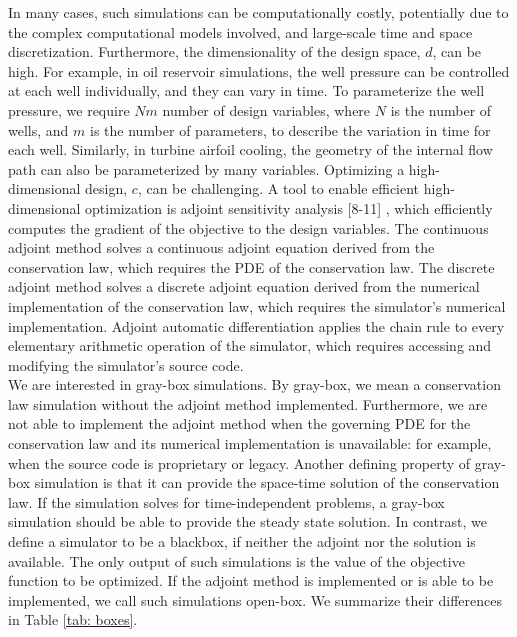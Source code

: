 \documentclass[a4paper,onecolumn]{article}
\theoremstyle{remark}
\begin{document}
\indent 
In many cases, such simulations can be computationally costly, potentially 
due to the complex computational models involved, and
large-scale time and space discretization. Furthermore, 
the dimensionality of the design space, $d$, can be high. 
For example, in oil reservoir simulations, the well pressure can be controlled at each well
individually, and they can vary in time.
To parameterize the well pressure, we require $Nm$ number of design variables, where $N$ is the number of wells,
and $m$ is the number of parameters, to describe the variation in time for each well.
Similarly, in turbine airfoil cooling,
the geometry of the internal flow path can also be parameterized by many variables.
Optimizing a high-dimensional design, $c$,
can be challenging.
A tool to enable efficient high-dimensional optimization is adjoint sensitivity analysis
[8-11]
, which efficiently computes the gradient of the objective to the design variables. 
The continuous adjoint method solves 
a continuous adjoint equation derived from the conservation law, which 
requires the PDE of the conservation law.
The discrete adjoint method solves a discrete adjoint equation derived 
from the numerical implementation of the conservation law,
which requires the simulator's numerical implementation.
Adjoint automatic differentiation applies the chain rule to every elementary arithmetic operation of the simulator,
which requires accessing and modifying the simulator's source code.\\


\indent We are interested in gray-box simulations. By gray-box, we mean a conservation law simulation
 without the adjoint method implemented. Furthermore, we are not able to implement the adjoint method
when the governing PDE for the conservation law and its numerical implementation is unavailable:
for example, when the source code is proprietary or legacy.
Another defining property of gray-box simulation is that it can provide the space-time solution of the conservation law.
If the simulation solves for time-independent problems, a gray-box simulation should be able to 
provide the steady state solution.
In contrast, we define a simulator to be a blackbox, if neither the adjoint nor the solution is available.
The only output of such simulations is the value of the objective function to be optimized.
If the adjoint method is implemented or is able to be implemented,
we call such simulations open-box.
We summarize their differences in Table \ref{tab: boxes}.\\
\end{document}
